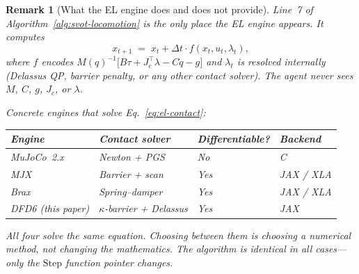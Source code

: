 \documentclass[11pt,a4paper]{article}
\newtheorem{remark}[theorem]{Remark}
\begin{document}
\begin{remark}[What the EL engine does and does not provide]
\label{rem:el-engine}
Line~7 of Algorithm~\ref{alg:svot-locomotion}
is the \emph{only} place the EL engine appears.
It computes
\[
  x_{t+1}
  \;=\;
  x_t
  + \Delta t \cdot f(x_t, u_t, \lambda_t),
\]
where $f$ encodes
$M(q)^{-1}\bigl[B\tau + J_c^\top\lambda - C\dot{q} - g\bigr]$
and $\lambda_t$ is resolved internally
(Delassus QP, barrier penalty, or any other contact solver).
The agent never sees $M$, $C$, $g$, $J_c$, or $\lambda$.

\medskip\noindent
Concrete engines that solve Eq.~\eqref{eq:el-contact}:

\smallskip
\begin{center}
\begin{tabular}{@{}llll@{}}
\toprule
\textbf{Engine} & \textbf{Contact solver}
  & \textbf{Differentiable?}
  & \textbf{Backend} \\
\midrule
MuJoCo~2.x & Newton + PGS & No  & C \\
MJX        & Barrier + scan & Yes & JAX / XLA \\
Brax       & Spring--damper & Yes & JAX / XLA \\
DFD6 (this paper) & $\kappa$-barrier + Delassus
  & Yes & JAX \\
\bottomrule
\end{tabular}
\end{center}

\smallskip\noindent
All four solve the same equation.
Choosing between them is choosing a numerical method,
not changing the mathematics.
The algorithm is identical in all cases---only the
$\mathrm{Step}$ function pointer changes.
\end{remark}
\end{document}
